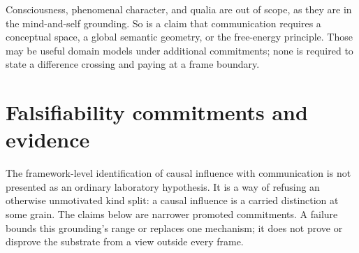 \documentclass[11pt,a4paper]{article}
\theoremstyle{remark}\newtheorem{remark}[definition]{Remark}
\begin{document}
Consciousness, phenomenal character, and qualia are out of scope, as they are in
the mind-and-self grounding. So is a claim that communication requires a
conceptual space, a global semantic geometry, or the free-energy principle.
Those may be useful domain models under additional commitments; none is required
to state a difference crossing and paying at a frame boundary.

\section{Falsifiability commitments and evidence}\label{sec:falsifiability}

The framework-level identification of causal influence with communication is not
presented as an ordinary laboratory hypothesis. It is a way of refusing an
otherwise unmotivated kind split: a causal influence is a carried distinction at
some grain. The claims below are narrower promoted commitments. A failure bounds
this grounding's range or replaces one mechanism; it does not prove or disprove
the substrate from a view outside every frame.
\end{document}
